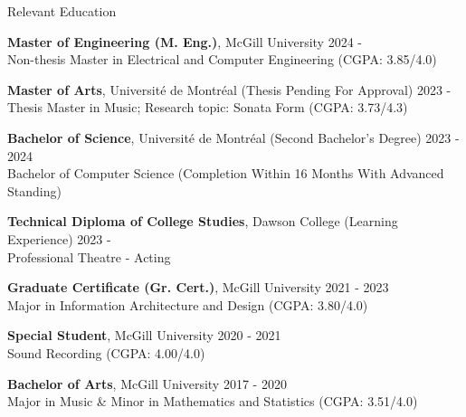\documentclass{resume} %
\begin{document}

\begin{rSection}{Relevant Education}


{\bf Master of Engineering (M. Eng.)}, McGill University \hfill {2024 -}\\
Non-thesis Master in Electrical and Computer Engineering (CGPA: 3.85/4.0) 
\vspace{-0.25em}

{\bf Master of Arts}, Université de Montréal (Thesis Pending For Approval) \hfill {2023 -}\\
Thesis Master in Music; Research topic: Sonata Form (CGPA: 3.73/4.3) 
\vspace{-0.25em}

{\bf Bachelor of Science}, Université de Montréal (Second Bachelor's Degree) \hfill {2023 - 2024}\\
Bachelor of Computer Science (Completion Within 16 Months With Advanced Standing)
\vspace{-0.25em}



{\bf Technical Diploma of College Studies}, Dawson College (Learning Experience) \hfill {2023 - }\\
Professional Theatre - Acting
\vspace{-0.25em}

{\bf Graduate Certificate (Gr. Cert.)}, McGill University \hfill {2021 - 2023}\\
Major in Information Architecture and Design (CGPA: 3.80/4.0)
\vspace{-0.25em}

{\bf Special Student}, McGill University \hfill {2020 - 2021}\\
Sound Recording (CGPA: 4.00/4.0)
\vspace{-0.25em}

{\bf Bachelor of Arts}, McGill University \hfill {2017 - 2020}\\
Major in Music \& Minor in Mathematics and Statistics (CGPA: 3.51/4.0) 
\vspace{-0.25em}

\end{rSection}
\end{document}
